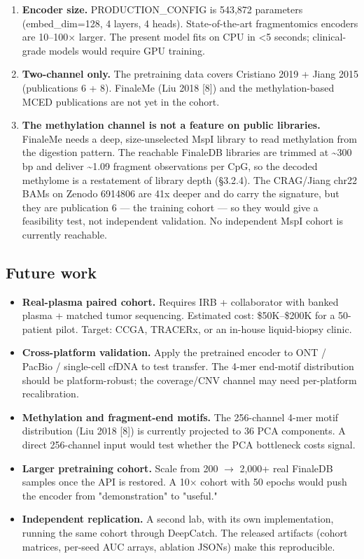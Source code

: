 \documentclass[11pt]{article}
\begin{document}
\begin{enumerate}
\item
\textbf{Encoder size.} PRODUCTION\_CONFIG is 543,872 parameters (embed\_dim=\allowbreak{}128, 4 layers, 4 heads). State-of-the-art fragmentomics encoders are 10--100$\times$ larger. The present model fits on CPU in \textless{}5 seconds; clinical-grade models would require GPU training.
\item
\textbf{Two-channel only.} The pretraining data covers Cristiano 2019 + Jiang 2015 (publications 6 + 8). FinaleMe (Liu 2018 [8]) and the methylation-based MCED publications are not yet in the cohort.
\item
\textbf{The methylation channel is not a feature on public libraries.} FinaleMe needs a deep, size-unselected MspI library to read methylation from the digestion pattern. The reachable FinaleDB libraries are trimmed at \textasciitilde{}300 bp and deliver \textasciitilde{}1.09 fragment observations per CpG, so the decoded methylome is a restatement of library depth (\S{}3.2.4). The CRAG/Jiang chr22 BAMs on Zenodo 6914806 are 41x deeper and do carry the signature, but they are publication 6 --- the training cohort --- so they would give a feasibility test, not independent validation. No independent MspI cohort is currently reachable.
\end{enumerate}

\subsection{Future work}
\begin{itemize}
\item
\textbf{Real-plasma paired cohort.} Requires IRB + collaborator with banked plasma + matched tumor sequencing. Estimated cost: \$50K--\$200K for a 50-patient pilot. Target: CCGA, TRACERx, or an in-house liquid-biopsy clinic.
\item
\textbf{Cross-platform validation.} Apply the pretrained encoder to ONT / PacBio / single-cell cfDNA to test transfer. The 4-mer end-motif distribution should be platform-robust; the coverage/CNV channel may need per-platform recalibration.
\item
\textbf{Methylation and fragment-end motifs.} The 256-channel 4-mer motif distribution (Liu 2018 [8]) is currently projected to 36 PCA components. A direct 256-channel input would test whether the PCA bottleneck costs signal.
\item
\textbf{Larger pretraining cohort.} Scale from 200 $\rightarrow$ 2,000+ real FinaleDB samples once the API is restored. A 10$\times$ cohort with 50 epochs would push the encoder from "demonstration" to "useful."
\item
\textbf{Independent replication.} A second lab, with its own implementation, running the same cohort through DeepCatch. The released artifacts (cohort matrices, per-seed AUC arrays, ablation JSONs) make this reproducible.
\end{itemize}
\end{document}
